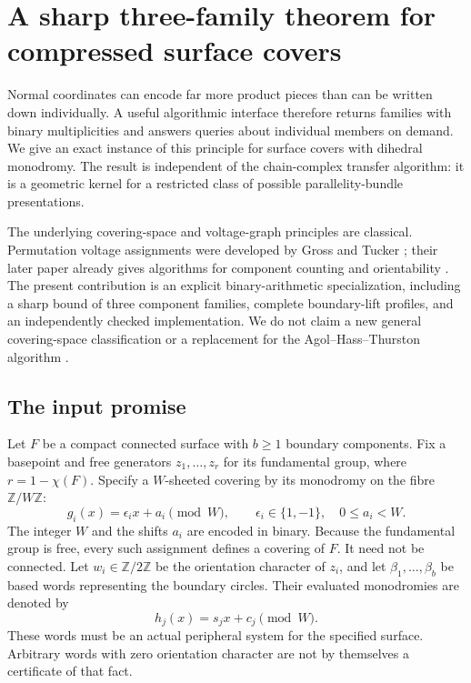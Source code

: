 \section{A sharp three-family theorem for compressed surface covers}
\label{sec:dihedral-covers}

Normal coordinates can encode far more product pieces than can be written
down individually.  A useful algorithmic interface therefore returns
families with binary multiplicities and answers queries about individual
members on demand.  We give an exact instance of this principle for
surface covers with dihedral monodromy.  The result is independent of the
chain-complex transfer algorithm: it is a geometric kernel for a
restricted class of possible parallelity-bundle presentations.

The underlying covering-space and voltage-graph principles are classical.
Permutation voltage assignments were developed by Gross and Tucker
\cite{GrossTucker1977}; their later paper already gives algorithms for
component counting and orientability \cite{GrossTucker1979}.  The present
contribution is an explicit binary-arithmetic specialization, including a
sharp bound of three component families, complete boundary-lift profiles,
and an independently checked implementation.  We do not claim a new
general covering-space classification or a replacement for the
Agol--Hass--Thurston algorithm \cite{AHT2006}.

\subsection{The input promise}

Let $F$ be a compact connected surface with $b\geq 1$ boundary components.
Fix a basepoint and free generators $z_1,\ldots,z_r$ for its fundamental
group, where $r=1-\chi(F)$.  Specify a $W$-sheeted covering by its
monodromy on the fibre $\mathbb Z/W\mathbb Z$:
\[
 g_i(x)=\epsilon_i x+a_i\pmod W,
 \qquad \epsilon_i\in\{1,-1\},\quad 0\leq a_i<W.
\]
The integer $W$ and the shifts $a_i$ are encoded in binary.  Because the
fundamental group is free, every such assignment defines a covering of
$F$.  It need not be connected.  Let $w_i\in\mathbb Z/2\mathbb Z$ be the
orientation character of $z_i$, and let $\beta_1,\ldots,\beta_b$ be based
words representing the boundary circles.  Their evaluated monodromies
are denoted by
\[
 h_j(x)=s_jx+c_j\pmod W.
\]
These words must be an actual peripheral system for the specified
surface.  Arbitrary words with zero orientation character are not by
themselves a certificate of that fact.

